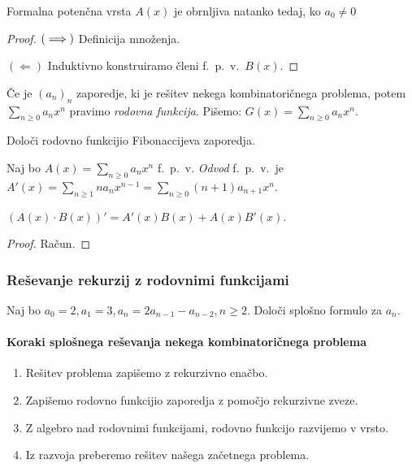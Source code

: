 \begin{trditev}
    Formalna potenčna vrsta $A(x)$ je obrnljiva natanko tedaj, ko $a_0 \neq 0$
\end{trditev}

\begin{proof}
    $(\implies)$ Definicija množenja.

    $(\Leftarrow)$ Induktivno konstruiramo členi f.\ p.\ v.\ $B(x)$.
\end{proof}

\begin{definicija}
    Če je $(a_n)_n$ zaporedje, ki je rešitev nekega kombinatoričnega problema, potem $\sum_{n \geq 0}a_n x^n$ pravimo \emph{rodovna funkcija}. Pišemo: $G(x) = \sum_{n \geq 0}a_n x^n$.
\end{definicija}

\begin{primer}
    Določi rodovno funkcijio Fibonaccijeva zaporedja.
\end{primer}

\begin{definicija}
    Naj bo $A(x) = \sum_{n \geq 0}a_n x^n$ f.\ p.\ v. \emph{Odvod} f.\ p.\ v.\ je $A'(x) =  \sum_{n \geq 1}na_n x^{n-1} =  \sum_{n \geq 0}(n+1)a_{n+1} x^n$.
\end{definicija}

\begin{trditev}
    $(A(x) \cdot B(x))' = A'(x)B(x) + A(x)B'(x)$.
\end{trditev}

\begin{proof}
    Račun.
\end{proof}

\subsubsection*{Reševanje rekurzij z rodovnimi funkcijami}
\begin{primer}
    Naj bo $a_0 = 2, a_1 = 3, a_n = 2a_{n-1}-a_{n-2}, n \geq 2$. Določi splošno formulo za $a_n$.
\end{primer}
\paragraph{Koraki splošnega reševanja nekega kombinatoričnega problema}
\begin{enumerate}
    \item Rešitev problema zapišemo z rekurzivno enačbo.
    \item Zapišemo rodovno funkcijio zaporedja z pomočjo rekurzivne zveze.
    \item Z algebro nad rodovnimi funkcijami, rodovno funkcijo razvijemo v vrsto.
    \item Iz razvoja preberemo rešitev našega začetnega problema.
\end{enumerate}

